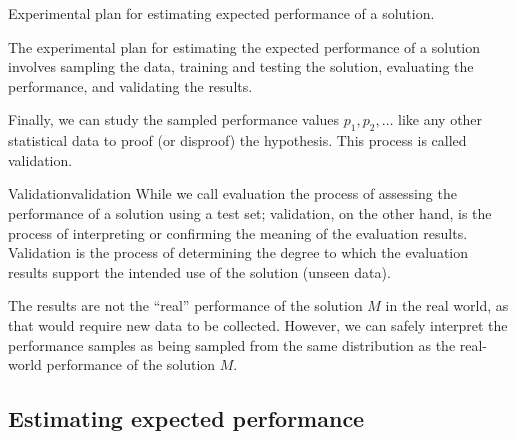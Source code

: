 \begin{figurebox}[label=fig:plan-single]{Experimental plan for estimating expected performance of a solution.}
  \tcblower
  The experimental plan for estimating the expected performance of a solution involves
  sampling the data, training and testing the solution, evaluating the performance, and
  validating the results.
\end{figurebox}

Finally, we can study the sampled performance values $p_1, p_2, \ldots$ like any other
statistical data to proof (or disproof) the hypothesis.  This process is called
validation.

\begin{defbox}{Validation}{validation}
  While we call evaluation the process of assessing the performance of a solution using a
  test set; validation, on the other hand, is the process of interpreting or confirming
  the meaning of the evaluation results.  Validation is the process of determining the
  degree to which the evaluation results support the intended use of the solution (unseen
  data).
\end{defbox}

The results are not the ``real'' performance of the solution
$M$ in the real world, as that would require new data to be collected.  However, we can
safely interpret the performance samples as being sampled from the same distribution as
the real-world performance of the solution $M$.


\subsection{Estimating expected performance}

